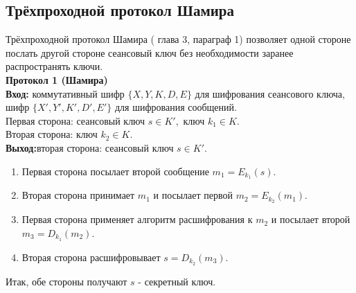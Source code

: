 
\subsection{Трёхпроходной протокол Шамира}
Трёхпроходной протокол Шамира (\autocite{Shnayer} глава 3, параграф 1) позволяет одной стороне послать другой стороне сеансовый ключ без необходимости заранее распространять ключи.\\
\textbf{Протокол 1 (Шамира)}\\
\hspace*{10mm}\textbf{Вход:} коммутативный шифр $\{X, Y, K, D, E\}$ для шифрования сеансового ключа, шифр $\{X', Y', K', D', E'\}$ для шифрования сообщений.\\
Первая сторона: сеансовый ключ $s\in K',$ ключ $k_{1}\in K.$\\
Вторая сторона: ключ $k_{2}\in K$.\\
\hspace*{10mm}\textbf{Выход:}вторая сторона: сеансовый ключ $s\in K'$.
\begin{enumerate}
	\item Первая сторона посылает второй сообщение $m_{1} = E_{k_{1}}(s).$
	\item Вторая сторона принимает $m_{1}$ и посылает первой $m_{2} = E_{k_{2}}(m_{1})$.
	\item Первая сторона применяет алгоритм расшифрования к $m_{2}$ и посылает второй $m_{3} = D_{k_{1}}(m_{2})$.
	\item Вторая сторона расшифровывает $s = D_{k_{2}}(m_{3})$.
\end{enumerate}
Итак, обе стороны получают $s$ - секретный ключ.
